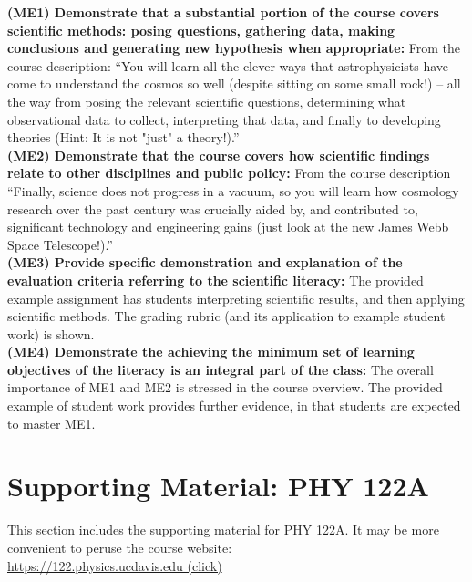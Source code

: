 \documentclass[12pt]{article}
\begin{document}
\noindent
{\bf (ME1) Demonstrate that a substantial portion of the course covers scientific methods: posing questions, gathering data, making conclusions and generating new hypothesis when appropriate:}
From the course description:  ``You will learn all the clever ways that astrophysicists have come to understand the cosmos so well (despite sitting on some small rock!) -- all the way from posing the relevant scientific questions, determining what observational data to collect, interpreting that data, and finally to developing theories (Hint: It is not "just" a theory!).''\\[1pt]

\noindent
{\bf (ME2) Demonstrate that the course covers how scientific findings relate to other disciplines and public policy:} 
From the course description ``Finally, science does not progress in a vacuum, so you will learn how cosmology research over the past century was crucially aided by, and contributed to, significant technology and engineering gains (just look at the new James Webb Space Telescope!).''\\[1pt]

\noindent
{\bf (ME3) Provide specific demonstration and explanation of the evaluation criteria referring to the scientific literacy:} 
The provided example assignment has students interpreting scientific results, and then applying scientific methods.  The grading rubric (and its application to example student work) is shown.\\[1pt]

\noindent
{\bf (ME4) Demonstrate the achieving the minimum set of learning objectives of the literacy is an integral part of the class:}  
The overall importance of ME1 and ME2 is stressed in the course overview.  The provided example of student work provides further evidence, in that students are expected to master ME1.\\

\appendix

\newpage
\section{Supporting Material: PHY 122A}
\label{sec:supa}

This section includes the supporting material for PHY 122A.  It may be more convenient to peruse the course website:\\
 
\href{https://122.physics.ucdavis.edu}{https://122.physics.ucdavis.edu
  (click)}\\[2pt]
\end{document}
